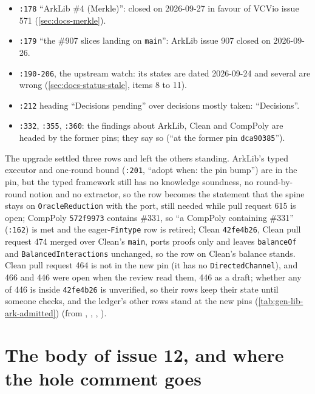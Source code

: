 \begin{itemize}
\item \texttt{:\allowbreak{}178} ``ArkLib \#4 (Merkle)'': closed on 2026-09-27 in favour of VCVio issue 571 (\cref{sec:docs-merkle}).
\item \texttt{:\allowbreak{}179} ``the \#907 slices landing on \texttt{main}'': ArkLib issue 907 closed on 2026-09-26.
\item \texttt{:\allowbreak{}190-\allowbreak{}206}, the upstream watch: its states are dated 2026-09-24 and several are wrong (\cref{sec:docs-status-stale}, items 8 to 11).
\item \texttt{:\allowbreak{}212} heading ``Decisions pending'' over decisions mostly taken: ``Decisions''.
\item \texttt{:\allowbreak{}332}, \texttt{:\allowbreak{}355}, \texttt{:\allowbreak{}360}: the findings about ArkLib, Clean and CompPoly are headed by the former pins; they say so (``at the former pin \texttt{dca90385}'').
\end{itemize}

\begin{sloppypar}
The upgrade settled three rows and left the others standing. ArkLib's typed executor and one-round bound (\texttt{:\allowbreak{}201}, ``adopt when: the pin bump'') are in the pin, but the typed framework still has no knowledge soundness, no round-by-round notion and no extractor, so the row becomes the statement that the spine stays on \texttt{Oracle\allowbreak{}Reduction} with the port, still needed while pull request 615 is open; CompPoly \texttt{572f9973} contains \#331, so ``a CompPoly containing \#331'' (\texttt{:\allowbreak{}162}) is met and the eager-\texttt{Fintype} row is retired; Clean \texttt{42fe4b26}, Clean pull request 474 merged over Clean's \texttt{main}, ports proofs only and leaves \texttt{balanceOf} and \texttt{Balanced\allowbreak{}Interactions} unchanged, so the row on Clean's balance stands. Clean pull request 464 is not in the new pin (it has no \texttt{Directed\allowbreak{}Channel}), and 466 and 446 were open when the review read them, 446 as a draft; whether any of 446 is inside \texttt{42fe4b26} is unverified, so their rows keep their state until someone checks, and the ledger's other rows stand at the new pins (\cref{tab:gen-lib-ark-admitted}) (from , , , ).
\end{sloppypar}

\section{The body of issue 12, and where the hole comment goes}\label{sec:docs-text-tracker}

